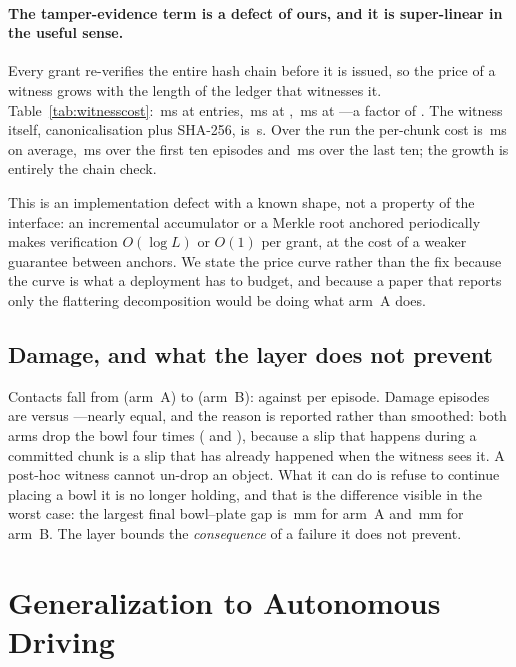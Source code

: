 \documentclass[conference]{IEEEtran}
\theoremstyle{definition}
\begin{document}
\paragraph{The tamper-evidence term is a defect of ours, and it is
super-linear in the useful sense.} Every grant re-verifies the entire hash
chain before it is issued, so the price of a witness grows with the length of
the ledger that witnesses it. Table~\ref{tab:witnesscost}: \ChainSmallMs\,ms at
\ChainSmallEntries{} entries, \ChainMidMs\,ms at \ChainMidEntries,
\ChainLargeMs\,ms at \ChainLargeEntries---a factor of \ChainGrowth. The witness
itself, canonicalisation plus SHA-256, is \WitnessHashUs\,\textmu s. Over the
run the per-chunk cost is \CELWitnessPerChunk\,ms on average, \CELWitnessFirstTen\,ms
over the first ten episodes and \CELWitnessLastTen\,ms over the last ten; the
growth is entirely the chain check.

This is an implementation defect with a known shape, not a property of the
interface: an incremental accumulator or a Merkle root anchored periodically
makes verification $O(\log L)$ or $O(1)$ per grant, at the cost of a weaker
guarantee between anchors. We state the price curve rather than the fix because
the curve is what a deployment has to budget, and because a paper that reports
only the flattering decomposition would be doing what arm~A does.

\subsection{Damage, and what the layer does not prevent}

Contacts fall from \SafeCollisions{} (arm~A) to \CELCollisions{} (arm~B):
\SafeContactsPerEpisode{} against \CELContactsPerEpisode{} per episode. Damage
episodes are \SafeDamageEpisodes{} versus \CELDamageEpisodes---nearly equal,
and the reason is reported rather than smoothed: both arms drop the bowl four
times (\SafeDrops{} and \CELDrops{}), because a slip that happens during a
committed chunk is a slip that has already happened when the witness sees it. A
post-hoc witness cannot un-drop an object. What it can do is refuse to continue
placing a bowl it is no longer holding, and that is the difference visible in
the worst case: the largest final bowl--plate gap is \SafeWorstPlateDist\,mm
for arm~A and \CELWorstPlateDist\,mm for arm~B. The layer bounds the
\emph{consequence} of a failure it does not prevent.

\section{Generalization to Autonomous Driving}
\label{sec:driving}
\end{document}
